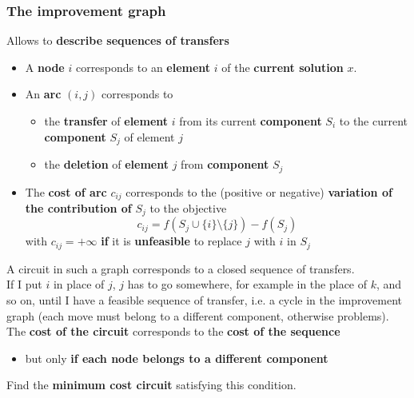 \subsubsection{The improvement graph} 
Allows to \textbf{describe sequences of transfers}
\begin{itemize}
	\item A \textbf{node} $i$ corresponds to an \textbf{element} $i$ of the \textbf{current solution} $x$.\\
	
	\item An \textbf{arc} $(i, j)$ corresponds to
	\begin{itemize}
		\item the \textbf{transfer} of \textbf{element} $i$ from its current \textbf{component} $S_i$ to the current \textbf{component} $S_j$ of element $j$
		\item the \textbf{deletion} of \textbf{element} $j$ from \textbf{component} $S_j$
	\end{itemize}
	\nn
	
	\item The \textbf{cost of arc} $c_{ij}$ corresponds to the (positive or negative) \textbf{variation of the contribution of} $S_j$ to the objective
	$$ c_{ij} = f (S_j \cup \{i\} \setminus \{j\}) - f (S_j) $$
	with $c_{ij} = +\infty$ \textbf{if} it is \textbf{unfeasible} to replace $j$ with $i$ in $S_j$
\end{itemize}

A circuit in such a graph corresponds to a closed sequence of transfers.\\

If I put $i$ in place of $j$, $j$ has to go somewhere, for example in the place of $k$, and so on, until I have a feasible sequence of transfer, i.e. a cycle in the improvement graph (each move must belong to a different component, otherwise problems).\\

The \textbf{cost of the circuit} corresponds to the \textbf{cost of the sequence}
\begin{itemize}
	\item but only \textbf{if each node belongs to a different component}
\end{itemize}

Find the \textbf{minimum cost circuit} satisfying this condition.\\

\newpage

